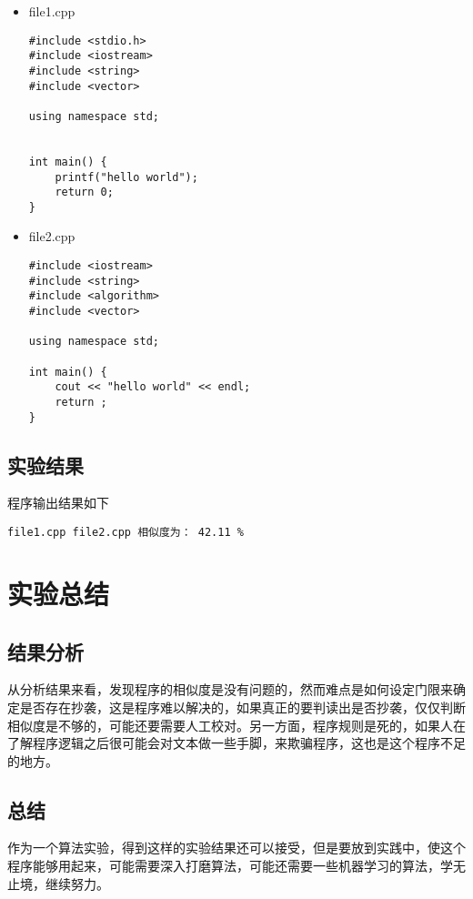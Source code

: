 \documentclass[UTF8]{ctexart}
\begin{document}
\begin{itemize} 
\item file1.cpp
\lstset{language=c++,
	frame=shadowbox}
\begin{lstlisting}
#include <stdio.h>
#include <iostream>
#include <string>
#include <vector>

using namespace std;


int main() {
	printf("hello world");
	return 0;
}

\end{lstlisting}

\item file2.cpp
\lstset{language=c++,
frame=shadowbox}
\begin{lstlisting} 
#include <iostream>
#include <string>
#include <algorithm>
#include <vector>

using namespace std;

int main() {
	cout << "hello world" << endl;
	return ;
}

\end{lstlisting}
\end{itemize}


\subsection{实验结果}
程序输出结果如下
\begin{lstlisting}
file1.cpp file2.cpp 相似度为： 42.11 %
\end{lstlisting}

\section{实验总结}

\subsection{结果分析}
从分析结果来看，发现程序的相似度是没有问题的，然而难点是如何设定门限来确定是否存在抄袭，这是程序难以解决的，如果真正的要判读出是否抄袭，仅仅判断相似度是不够的，可能还要需要人工校对。另一方面，程序规则是死的，如果人在了解程序逻辑之后很可能会对文本做一些手脚，来欺骗程序，这也是这个程序不足的地方。
\subsection{总结}
作为一个算法实验，得到这样的实验结果还可以接受，但是要放到实践中，使这个程序能够用起来，可能需要深入打磨算法，可能还需要一些机器学习的算法，学无止境，继续努力。
\end{document}
